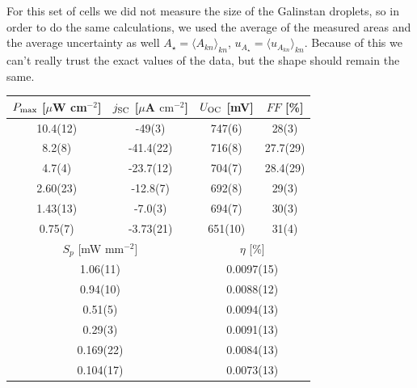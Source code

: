 For this set of cells we did not measure the size of the Galinstan droplets, so in order to do the same calculations, we used the average of the measured areas and the average uncertainty as well $A_\star = \langle A_{kn} \rangle_{kn}$, $u_{A_\star} = \langle u_{A_{kn}}  \rangle_{kn}$. Because of this we can't really trust the exact values of the data, but the shape should remain the same.
\begin{table}[]
\begin{tabular}{@{}cccc@{}}
\toprule
$P_{\text{max}}$ [$\mu$W cm$^{-2}$] & $j_{\text{SC}}$ [$\mu$A $\mathrm{cm}^{-2}$] & $U_{\text{OC}}$ [mV]          & $FF$ [\%]         \\ \midrule
10.4(12)                   & -49(3)                             & 747(6)               & 28(3)             \\
8.2(8)                     & -41.4(22)                          & 716(8)               & 27.7(29)          \\
4.7(4)                     & -23.7(12)                          & 704(7)               & 28.4(29)          \\
2.60(23)                   & -12.8(7)                           & 692(8)               & 29(3)             \\
1.43(13)                   & -7.0(3)                            & 694(7)               & 30(3)             \\
0.75(7)                    & -3.73(21)                          & 651(10)              & 31(4)             \\ \midrule
\multicolumn{2}{c}{$S_p$ [mW mm$^{-2}$]}                        & \multicolumn{2}{c}{$\eta$ [\%]} \\ \midrule
\multicolumn{2}{c}{1.06(11)}                                    & \multicolumn{2}{c}{0.0097(15)}           \\
\multicolumn{2}{c}{0.94(10)}                                    & \multicolumn{2}{c}{0.0088(12)}           \\
\multicolumn{2}{c}{0.51(5)}                                     & \multicolumn{2}{c}{0.0094(13)}           \\
\multicolumn{2}{c}{0.29(3)}                                     & \multicolumn{2}{c}{0.0091(13)}           \\
\multicolumn{2}{c}{0.169(22)}                                   & \multicolumn{2}{c}{0.0084(13)}           \\
\multicolumn{2}{c}{0.104(17)}                                   & \multicolumn{2}{c}{0.0073(13)}           \\ \bottomrule
\end{tabular}
\end{table}


